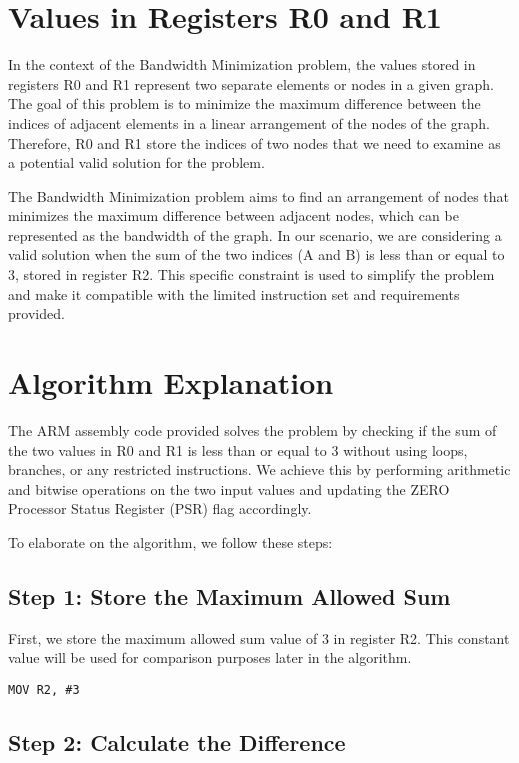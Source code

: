 \section{Values in Registers R0 and R1}

In the context of the Bandwidth Minimization problem, the values stored in registers R0 and R1 represent two separate elements or nodes in a given graph. The goal of this problem is to minimize the maximum difference between the indices of adjacent elements in a linear arrangement of the nodes of the graph. Therefore, R0 and R1 store the indices of two nodes that we need to examine as a potential valid solution for the problem.

The Bandwidth Minimization problem aims to find an arrangement of nodes that minimizes the maximum difference between adjacent nodes, which can be represented as the bandwidth of the graph. In our scenario, we are considering a valid solution when the sum of the two indices (A and B) is less than or equal to 3, stored in register R2. This specific constraint is used to simplify the problem and make it compatible with the limited instruction set and requirements provided.

\section{Algorithm Explanation}

The ARM assembly code provided solves the problem by checking if the sum of the two values in R0 and R1 is less than or equal to 3 without using loops, branches, or any restricted instructions. We achieve this by performing arithmetic and bitwise operations on the two input values and updating the ZERO Processor Status Register (PSR) flag accordingly.

To elaborate on the algorithm, we follow these steps:

\subsection{Step 1: Store the Maximum Allowed Sum}

First, we store the maximum allowed sum value of 3 in register R2. This constant value will be used for comparison purposes later in the algorithm.

\begin{verbatim}
MOV R2, #3
\end{verbatim}

\subsection{Step 2: Calculate the Difference}

